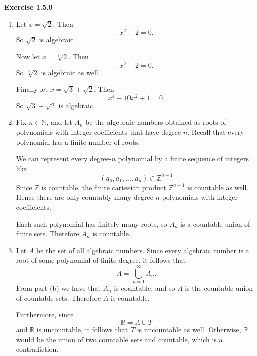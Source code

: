 \documentclass[12pt]{article}
\begin{document}
\noindent{} \textbf{Exercise 1.5.9}
\begin{enumerate}
    \item [(a)] Let $x = \sqrt{2}$. Then
          \[
              x^2 - 2 = 0.
          \]
          So $\sqrt{2}$ is algebraic

          Now let $x = \sqrt[3]{2}$.
          Then
          \[
              x^3 - 2 = 0.
          \]
          So $\sqrt[3]{2}$ is algebraic as well.

          Finally let $x = \sqrt{3} + \sqrt{2}$.
          Then
          \[
              x^4 - 10x^2 + 1 = 0.
          \]
          So $\sqrt3 + \sqrt2$ is algebraic.

    \item [(b)] Fix $n \in \mathbb{N}$, and let $A_n$ be the algebraic
          numbers obtained as roots of polynomials with integer coefficients
          that have degree $n$. Recall that every polynomial has a finite number of roots.

          We can represent every degree-$n$ polynomial by a finite sequence of integers like
          \[
              (a_0, a_1, ... , a_n) \in \mathbb{Z}^{n+1}
          \]
          Since $\mathbb{Z}$ is countable, the finite cartesian product
          $\mathbb{Z}^{n+1}$ is countable as well. Hence there are only
          countably many degree-\(n\) polynomials with integer coefficients.

          Each such polynomial has finitely many roots, so $A_n$ is a countable
          union of finite sets. Therefore $A_n$ is countable.
    \item [(c)]
          Let $A$ be the set of all algebraic numbers. Since every algebraic number
          is a root of some polynomial of finite degree, it follows that
          \[
              A = \bigcup_{n=1}^{\infty} A_n.
          \]
          From part (b) we have that $A_n$ is countable, and so $A$ is the countable
          union of countable sets. Therefore $A$ is countable.

          Furthermore, since
          \[
              \mathbb{R} = A \cup T
          \]
          and $\mathbb{R}$ is uncountable, it follows that $T$ is uncountable as well.
          Otherwise, $\mathbb{R}$ would be the union of two countable sets and countable, which is a contradiction.


\end{enumerate}
\end{document}
